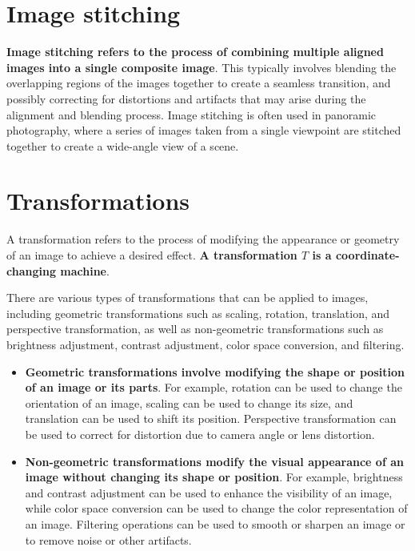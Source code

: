 \documentclass{article}
\begin{document}
\section*{Image stitching}

\textbf{Image stitching refers to the process of combining multiple aligned images into a single composite image}. This typically involves blending the overlapping regions of the images together to create a seamless transition, and possibly correcting for distortions and artifacts that may arise during the alignment and blending process. Image stitching is often used in panoramic photography, where a series of images taken from a single viewpoint are stitched together to create a wide-angle view of a scene.

\newpage

\section*{Transformations}

A transformation refers to the process of modifying the appearance or geometry of an image to achieve a desired effect. \textbf{A transformation $T$ is a coordinate-changing machine}.

There are various types of transformations that can be applied to images, including geometric transformations such as scaling, rotation, translation, and perspective transformation, as well as non-geometric transformations such as brightness adjustment, contrast adjustment, color space conversion, and filtering.

\begin{itemize}
    \item \textbf{Geometric transformations involve modifying the shape or position of an image or its parts}. For example, rotation can be used to change the orientation of an image, scaling can be used to change its size, and translation can be used to shift its position. Perspective transformation can be used to correct for distortion due to camera angle or lens distortion.
\end{itemize}

\begin{itemize}
    \item \textbf{Non-geometric transformations modify the visual appearance of an image without changing its shape or position}. For example, brightness and contrast adjustment can be used to enhance the visibility of an image, while color space conversion can be used to change the color representation of an image. Filtering operations can be used to smooth or sharpen an image or to remove noise or other artifacts.
\end{itemize}
\end{document}
